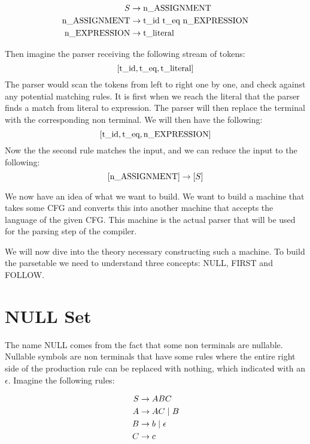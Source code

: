\begin{equation*}
  \begin{split}
      S &\rightarrow \text{n\textunderscore ASSIGNMENT} \\
      \text{n\textunderscore ASSIGNMENT} &\rightarrow \text{\text{t\textunderscore id}   \text{t\textunderscore eq}   \text{n\textunderscore EXPRESSION}} \\
      \text{n\textunderscore EXPRESSION} &\rightarrow \text{t\textunderscore literal} \\
  \end{split}
\end{equation*}

Then imagine the parser receiving the following stream of tokens:
\[[\text{t\textunderscore id}, \text{t\textunderscore eq}, \text{t\textunderscore literal}]\]
The parser would scan the tokens from left to right one by one, and check against any potential matching rules. It is first when we reach the literal that the parser finds a match from literal to expression. The parser will then replace the terminal with the corresponding non terminal. We will then have the following: 
\[[\text{t\textunderscore id}, \text{t\textunderscore eq}, \text{n\textunderscore EXPRESSION}]\]
Now the the second rule matches the input, and we can reduce the input to the following:
\[[\text{n\textunderscore ASSIGNMENT}] \rightarrow [S]\]

We now have an idea of what we want to build. We want to build a machine that takes some CFG and converts this into another machine that accepts the language of the given CFG. This machine is the actual parser that will be used for the parsing step of the compiler.

We will now dive into the theory necessary constructing such a machine. To build the parsetable we need to understand three concepts: NULL, FIRST and FOLLOW.

\section{NULL Set}

The name NULL comes from the fact that some non terminals are nullable. Nullable symbols are non terminals that have some rules where the entire right side of the production rule can be replaced with nothing, which indicated with an $\epsilon$. Imagine the following rules:

\begin{equation*}
  \begin{split}
      S &\rightarrow ABC \\
      A &\rightarrow AC \hspace*{3px}|\hspace*{3px}B\\
      B &\rightarrow b \hspace*{3px}|\hspace*{3px}\epsilon \\
      C &\rightarrow c
  \end{split}
\end{equation*}

